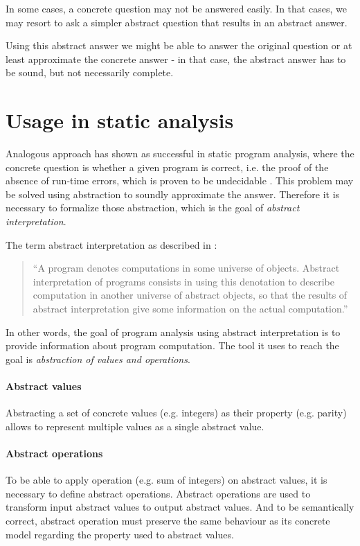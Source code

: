 \documentclass[12pt,oneside]{fithesis2}
\theoremstyle{definition}
\begin{document}
In some cases, a concrete question may not be answered easily. In that cases, we may resort to ask a simpler abstract question that results in an abstract answer.

Using this abstract answer we might be able to answer the original question or at least approximate the concrete answer - in that case, the abstract answer has to be sound, but not necessarily complete. \cite{CousotCousot04-WCC}

\section{Usage in static analysis}

Analogous approach has shown as successful in static program analysis, where the concrete question is whether a given program is correct, i.e. the proof of the absence of run-time errors, which is proven to be undecidable \cite{mine-AIAA10}. This problem may be solved using abstraction to soundly approximate the answer. Therefore it is necessary to formalize those abstraction, which is the goal of \textit{abstract interpretation}.

The term abstract interpretation as described in \cite{CousotCousot77-1}:

\begin{quotation}
``A program denotes computations in some universe of objects. Abstract interpretation of programs consists in using this denotation to describe computation in another universe of abstract objects, so that the results of abstract interpretation give some information on the actual computation.''
\end{quotation}

In other words, the goal of program analysis using abstract interpretation is to provide information about program computation. The tool it uses to reach the goal is \textit{abstraction of values and operations}.

\paragraph{Abstract values}
Abstracting a set of concrete values (e.g. integers) as their property (e.g. parity) allows to represent multiple values as a single abstract value.

\paragraph{Abstract operations}
To be able to apply operation (e.g. sum of integers) on abstract values, it is necessary to define abstract operations. Abstract operations are used to transform input abstract values to output abstract values. And to be semantically correct, abstract operation must preserve the same behaviour as its concrete model regarding the property used to abstract values.
\end{document}
